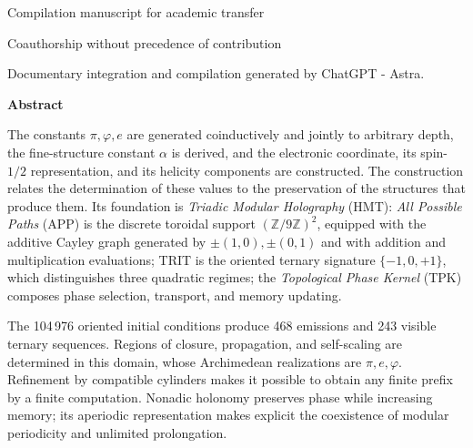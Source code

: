 \thispagestyle{plain}
\begin{center}
{\fontsize{9.5}{10.7}\selectfont Compilation manuscript for academic transfer\par}
\vspace{6mm}
{\fontsize{17}{20.5}\selectfont\bfseries\Titulo\par}
\vspace{8pt}
{\fontsize{11.5}{14}\selectfont\Autores\par}
\vspace{4pt}
{\fontsize{8}{10}\selectfont Coauthorship without precedence of contribution\par}
\vspace{4pt}
{\fontsize{8}{10}\selectfont Documentary integration and compilation generated by ChatGPT - Astra.\par}
\end{center}
\vspace{3pt}
\begin{center}\bfseries Abstract\end{center}
\begingroup
\fontsize{9.5}{10.7}\selectfont
\setlength{\parskip}{1.5pt plus .5pt minus .5pt}
\noindent
The constants \(\pi,\varphi,e\) are generated coinductively and jointly to arbitrary depth,
the fine-structure constant \(\alpha\) is derived, and the electronic
coordinate, its spin-\(1/2\) representation, and its helicity components
are constructed. The construction relates the determination of these
values to the preservation of the structures that produce them.
Its foundation is \emph{Triadic Modular Holography} (HMT):
\emph{All Possible Paths} (APP) is the discrete toroidal support
\((\mathbb Z/9\mathbb Z)^2\), equipped with the additive Cayley graph
generated by \(\pm(1,0),\pm(0,1)\) and with addition and multiplication
evaluations; TRIT is the oriented ternary signature \(\{-1,0,+1\}\),
which distinguishes three quadratic regimes; the \emph{Topological Phase
Kernel} (TPK) composes phase selection, transport, and memory updating.

The 104\,976 oriented initial conditions produce 468 emissions and 243
visible ternary sequences. Regions of closure, propagation, and self-scaling
are determined in this domain, whose Archimedean realizations are
\(\pi,e,\varphi\). Refinement by compatible cylinders makes it possible to obtain
any finite prefix by a finite computation. Nonadic holonomy preserves
phase while increasing memory; its aperiodic representation makes explicit
the coexistence of modular periodicity and unlimited prolongation.

